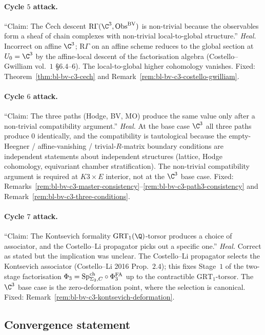 \paragraph{Cycle $5$ attack.} ``Claim: The \v{C}ech descent
$\mathrm{R}\Gamma(\C^3, \Obs^\BV)$ is non-trivial because the
observables form a sheaf of chain complexes with non-trivial
local-to-global structure.''
\emph{Heal.} Incorrect on affine $\C^3$; $\mathrm{R}\Gamma$ on an
affine scheme reduces to the global section at $U_0 = \C^3$ by the
affine-local descent of the factorisation algebra (Costello--Gwilliam
vol.\ $1$ \S$6$.$4$--$6$). The local-to-global higher cohomology
vanishes. Fixed: Theorem~\ref{thm:bl-bv-c3-cech} and
Remark~\ref{rem:bl-bv-c3-costello-gwilliam}.

\paragraph{Cycle $6$ attack.} ``Claim: The three paths (Hodge, BV, MO)
produce the same value only after a non-trivial compatibility
argument.''
\emph{Heal.} At the base case $\C^3$ all three paths produce $0$
identically, and the compatibility is tautological because the
empty-Heegner / affine-vanishing / trivial-$R$-matrix boundary
conditions are independent statements about independent structures
(lattice, Hodge cohomology, equivariant chamber stratification). The
non-trivial compatibility argument is required at $K3\times E$
interior, not at the $\C^3$ base case. Fixed:
Remarks~\ref{rem:bl-bv-c3-master-consistency}--\ref{rem:bl-bv-c3-path3-consistency}
and Remark~\ref{rem:bl-bv-c3-three-conditions}.

\paragraph{Cycle $7$ attack.} ``Claim: The Kontsevich formality
$\mathrm{GRT}_1(\Q)$-torsor produces a choice of associator, and
the Costello--Li propagator picks out a specific one.''
\emph{Heal.} Correct as stated but the implication was unclear.
The Costello--Li propagator selects the Kontsevich associator
(Costello--Li 2016 Prop.~$2.4$); this fixes Stage~$1$ of the
two-stage factorisation $\Phi_3 = \mathrm{Sp}^{\mathrm{ch}}_{\Sigma_2, C}\circ \Phi^{\mathrm{FA}}_3$
up to the contractible $\mathrm{GRT}_1$-torsor. The $\C^3$ base case
is the zero-deformation point, where the selection is canonical.
Fixed: Remark~\ref{rem:bl-bv-c3-kontsevich-deformation}.

\subsection*{Convergence statement}

